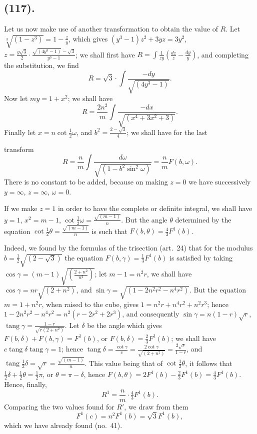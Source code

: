 \documentclass{article}
\begin{document}
\subsection*{(117).}

Let us now make use of another transformation to obtain the value of $R$. Let $\sqrt[3]{(1-z^{3})}=1-\frac{z}{y}$, which gives $(y^{3}-1)z^{2}+3yz=3y^{2}$, $z=\frac{y\sqrt{3}}{2}\cdot\frac{\sqrt{(4y^{3}-1)}-\sqrt{3}}{y^{3}-1}$; we shall first have $R=\displaystyle\int\frac{1}{zy}\left(\frac{dz}{z}-\frac{dy}{y}\right)$, and completing the substitution, we find
\[ R=\sqrt{3}\cdot\int\frac{-dy}{\sqrt{(4y^{3}-1)}}. \]
Now let $my=1+x^{2}$; we shall have
\[ R=\frac{2n^{2}}{m}\int\frac{-dx}{\sqrt{(x^{4}+3x^{2}+3)}}. \]
Finally let $x=n\cot\frac{1}{2}\omega$, and $b^{2}=\frac{2-\sqrt{3}}{4}$; we shall have for the last

transform
\[ R=\frac{n}{m}\int\frac{d\omega}{\sqrt{(1-b^{2}\sin^{2}\omega)}}=\frac{n}{m}F(b,\omega). \]
There is no constant to be added, because on making $z=0$ we have successively $y=\infty$, $z=\infty$, $\omega=0$.

If we make $z=1$ in order to have the complete or definite integral, we shall have $y=1$, $x^{2}=m-1$, $\cot\frac{1}{2}\omega=\frac{\sqrt{(m-1)}}{n}$. But the angle $\theta$ determined by the equation $\cot\frac{1}{2}\theta=\frac{\sqrt{(m-1)}}{n}$ is such that $F(b,\theta)=\frac{4}{3}F^{1}(b)$.

Indeed, we found by the formulas of the trisection (art.\ 24) that for the modulus $b=\frac{1}{2}\sqrt{(2-\sqrt{3})}$ the equation $F(b,\gamma)=\frac{1}{3}F^{1}(b)$ is satisfied by taking $\cos\gamma=(m-1)\sqrt{\left(\frac{2+n^{2}}{n^{2}}\right)}$; let $m-1=n^{2}r$, we shall have $\cos\gamma=nr\sqrt{(2+n^{2})}$, and $\sin\gamma=\sqrt{(1-2n^{2}r^{2}-n^{4}r^{2})}$. But the equation $m=1+n^{2}r$, when raised to the cube, gives $1=n^{2}r+n^{4}r^{2}+n^{2}r^{3}$; hence $1-2n^{2}r^{2}-n^{4}r^{2}=n^{2}(r-2r^{2}+2r^{3})$, and consequently $\sin\gamma=n(1-r)\sqrt{r}$, $\operatorname{tang}\gamma=\frac{1-r}{\sqrt{r(2+n^{2})}}$. Let $\delta$ be the angle which gives $F(b,\delta)+F(b,\gamma)=F^{1}(b)$, or $F(b,\delta)=\frac{2}{3}F^{1}(b)$; we shall have $c\operatorname{tang}\delta\operatorname{tang}\gamma=1$; hence $\operatorname{tang}\delta=\frac{\cot\gamma}{c}=\frac{2\cot\gamma}{\sqrt{(2+n^{2})}}=\frac{2\sqrt{r}}{1-r}$, and $\operatorname{tang}\frac{1}{2}\delta=\sqrt{r}=\frac{\sqrt{(m-1)}}{n}$. This value being that of $\cot\frac{1}{2}\theta$, it follows that $\frac{1}{2}\delta+\frac{1}{2}\theta=\frac{1}{2}\pi$, or $\theta=\pi-\delta$, hence $F(b,\theta)=2F^{1}(b)-\frac{2}{3}F^{1}(b)=\frac{4}{3}F^{1}(b)$. Hence, finally,
\[ R^{1}=\frac{n}{m}\cdot\tfrac{4}{3}F^{1}(b). \]
Comparing the two values found for $R'$, we draw from them
\[ F^{1}(c)=n^{2}F^{1}(b)=\sqrt{3}F^{1}(b), \]
which we have already found (no.\ 41).
\end{document}

